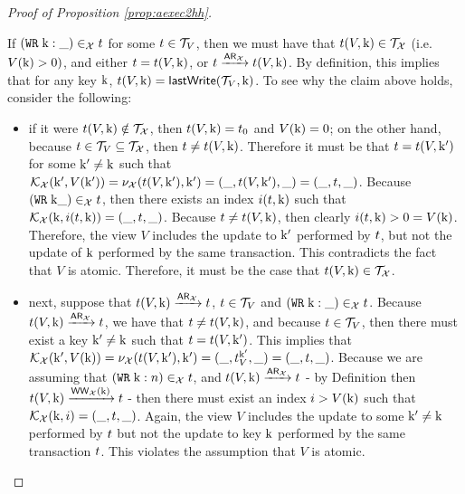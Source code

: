 \begin{proof}[Proof of Proposition \ref{prop:aexec2hh}]
\begin{itemize}
If $({{\tt WR}}\;\mathrm{k}: \_ ) \in_{\mathcal{X}} t$ for some $t \in \mathcal{T}_{V}$, 
then we must have that $t(V, \mathrm{k}) \in \mathcal{T}_{\mathcal{X}}$ (i.e. $V(\mathrm{k}) > 0)$, and 
either $t = t(V, \mathrm{k})$, or $t \xrightarrow{{\sf{AR}}_{\mathcal{X}}} 
t(V, \mathrm{k})$. By definition, this implies that for any key $\mathrm{k}$, 
$t(V, \mathrm{k}) = \mathsf{lastWrite}(\mathcal{T}_{V}, \mathrm{k})$.
To see why the claim above holds, consider the following:
\begin{itemize} 
\item if it were $t(V, \mathrm{k}) \notin \mathcal{T}_{\mathcal{X}}$, 
then $t(V, \mathrm{k}) = t_0$ and $V(\mathrm{k}) = 0$; on the other hand, 
because $t \in \mathcal{T}_{V} \subseteq \mathcal{T}_{\mathcal{X}}$, then $t \neq t(V, \mathrm{k})$. 
Therefore it must be that  $t = t(V, \mathrm{k}')$ for some 
$\mathrm{k}' \neq \mathrm{k}$ such that $\mathcal{K}_{\mathcal{X}}(\mathrm{k}', V(\mathrm{k}')) = 
\nu_{\mathcal{X}}( t({V}, \mathrm{k}'), \mathrm{k}') = (\_, t(V, \mathrm{k}'), \_) = 
(\_, t, \_)$. 
Because $({{\tt WR}}\;\mathrm{k} \_) \in_{\mathcal{X}} t$, 
then there exists an index $i(t, \mathrm{k})$ 
such that  $\mathcal{K}_{\mathcal{X}}(\mathrm{k}, i(t, \mathrm{k})) = (\_, t, \_)$. 
Because $t \neq t(V, \mathrm{k})$, then clearly $i(t, \mathrm{k}) > 0 = V(\mathrm{k})$. 
Therefore, the view $V$ includes the update to $\mathrm{k}'$ performed by 
$t$, but not the update of $\mathrm{k}$ performed by the same transaction.
This contradicts the fact that $V$ is atomic. 
Therefore, it must be the case that $t(V, {\mathrm{k}}) \in \mathcal{T}_{\mathcal{X}}$.
\item next, suppose that $t(V, \mathrm{k}) \xrightarrow{{\sf{AR}}_{\mathcal{X}}} 
t$, $t \in \mathcal{T}_{V}$ and $({{\tt WR}}\;\mathrm{k}: \_) \in_{\mathcal{X}} t$. 
Because $t(V, \mathrm{k}) \xrightarrow{{\sf{AR}}_{\mathcal{X}}} t$, 
we have that $t \neq t(V, \mathrm{k})$, and because 
$t \in \mathcal{T}_{V}$, then there must exist a key $\mathrm{k}' \neq \mathrm{k}$ such 
that $t = t({V}, \mathrm{k'})$. This implies that $\mathcal{K}_{\mathcal{X}}(\mathrm{k}', V(\mathrm{k})) = 
\nu_{\mathcal{X}}(t({V}, \mathrm{k'}), \mathrm{k}') = (\_, t_{V}^{\mathrm{k'}}, \_) = (\_, t, \_)$. 
Because we are assuming that $({{\tt WR}}\;\mathrm{k}: n) \in_{\mathcal{X}} t$, and  
$t(V, \mathrm{k}) \xrightarrow{{\sf{AR}}_{\mathcal{X}}} t$ - 
 by Definition then $t({V}, \mathrm{k}) \xrightarrow{{\mathsf{WW}}_{\mathcal{X}}(\mathrm{k})} t$ -  
then there must exist an index $i > V(\mathrm{k})$ such that $\mathcal{K}_{\mathcal{X}}(\mathrm{k}, i) = (\_, t, \_)$. 
Again,  the view $V$ includes the update to some $\mathrm{k}' \neq \mathrm{k}$ performed by $t$ 
but not the update to key $\mathrm{k}$ performed by the same transaction $t$. This violates the assumption that $V$ is 
atomic. 
\end{itemize}


\end{itemize}
\end{proof}
